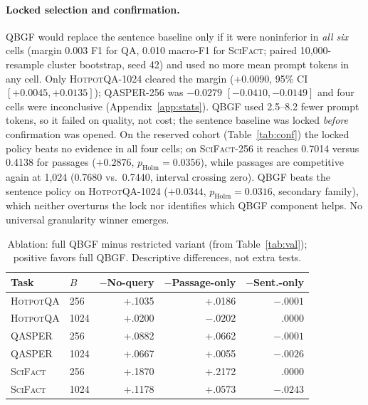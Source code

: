 \documentclass[10pt,twocolumn,letterpaper]{article}
\newcommand{\qbgf}{\textsc{QBGF}\xspace}
\newcommand{\hotpot}{\textsc{HotpotQA}\xspace}
\newcommand{\qasper}{\textsc{QASPER}\xspace}
\newcommand{\scifact}{\textsc{SciFact}\xspace}
\newcommand{\SmallTable}{\footnotesize\setlength{\tabcolsep}{3.6pt}}
\begin{document}
\paragraph{Locked selection and confirmation.} \qbgf would replace the sentence baseline only if it were noninferior in \emph{all six} cells (margin 0.003 F1 for QA, 0.010 macro-F1 for \scifact; paired 10,000-resample cluster bootstrap, seed 42) and used no more mean prompt tokens in any cell. Only \hotpot-1024 cleared the margin ($+0.0090$, 95\% CI $[+0.0045,+0.0135]$); \qasper-256 was $-0.0279$ $[-0.0410,-0.0149]$ and four cells were inconclusive (Appendix~\ref{app:stats}). QBGF used 2.5--8.2 fewer prompt tokens, so it failed on quality, not cost; the sentence baseline was locked \emph{before} confirmation was opened. On the reserved cohort (Table~\ref{tab:conf}) the locked policy beats no evidence in all four cells; on \scifact-256 it reaches 0.7014 versus 0.4138 for passages ($+0.2876$, $p_{\mathrm{Holm}}{=}0.0356$), while passages are competitive again at 1,024 (0.7680 vs.\ 0.7440, interval crossing zero). QBGF beats the sentence policy on \hotpot-1024 ($+0.0344$, $p_{\mathrm{Holm}}{=}0.0316$, secondary family), which neither overturns the lock nor identifies which QBGF component helps. No universal granularity winner emerges.

\begin{table}[t]\centering\SmallTable
\caption{Ablation: full QBGF minus restricted variant (from Table~\ref{tab:val}); positive favors full QBGF. Descriptive differences, not extra tests.}\label{tab:abl}
\begin{tabular}{llrrr}\toprule
Task & $B$ & $-$No-query & $-$Passage-only & $-$Sent.-only\\\midrule
\hotpot & 256 & +.1035 & +.0186 & $-.0001$\\
\hotpot & 1024 & +.0200 & $-.0202$ & .0000\\
\qasper & 256 & +.0882 & +.0662 & $-.0001$\\
\qasper & 1024 & +.0667 & +.0055 & $-.0026$\\
\scifact & 256 & +.1870 & +.2172 & .0000\\
\scifact & 1024 & +.1178 & +.0573 & $-.0243$\\\bottomrule
\end{tabular}\end{table}
\end{document}

